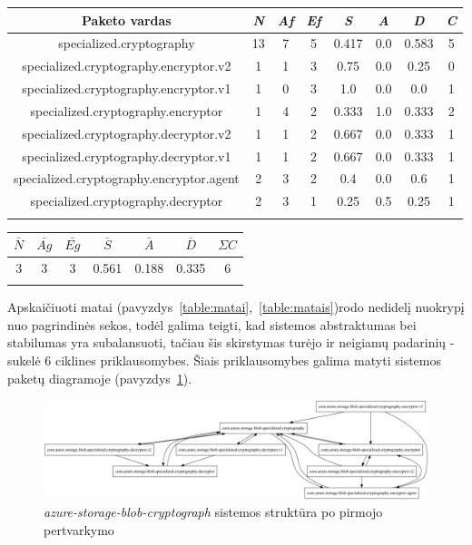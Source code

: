 \begin{center}
    \begin{tabular}{|c|c|c|c|c|c|c|c|}
        \hline
        Paketo vardas & \textit{N} & \textit{Af} & \textit{Ef} & \textit{S} & \textit{A} & \textit{D} & \textit{C} \\ [0.5ex]
        \hline\hline
        specialized.cryptography & 13 & 7 & 5 & 0.417 & 0.0 & 0.583 & 5 \\
        \hline
        specialized.cryptography.encryptor.v2 & 1 & 1 & 3 & 0.75 & 0.0 & 0.25 & 0 \\
        \hline
        specialized.cryptography.encryptor.v1 & 1 & 0 & 3 & 1.0 & 0.0 & 0.0 & 1 \\
        \hline
        specialized.cryptography.encryptor & 1 & 4 & 2 & 0.333 & 1.0 & 0.333 & 2 \\
        \hline
        specialized.cryptography.decryptor.v2 & 1 & 1 & 2 & 0.667 & 0.0 & 0.333 & 1 \\
        \hline
        specialized.cryptography.decryptor.v1 & 1 & 1 & 2 & 0.667 & 0.0 & 0.333 & 1\\
        \hline
        specialized.cryptography.encryptor.agent & 2 & 3 & 2 & 0.4 & 0.0 & 0.6 & 1\\
        \hline
        specialized.cryptography.decryptor & 2 & 3 & 1 & 0.25 & 0.5 & 0.25 & 1 \\
        \hline
    \label{table:matai}
    \end{tabular}
    \begin{tabular}{|c|c|c|c|c|c|c|}
        \hline
        $\bar{N}$ & $\bar{Ag}$ & $\bar{Eg}$ & $\bar{S}$ & $\bar{A}$ & $\bar{D}$ & $\Sigma C$ \\ [0.5ex]
        \hline\hline
        3 & 3 & 3 & 0.561 & 0.188 & \cellcolor{green!25} 0.335 & \cellcolor{red!25} 6 \\
        \hline
    \label{table:matais}
    \end{tabular}
\end{center}
Apskaičiuoti matai (pavyzdys~\ref{table:matai},~\ref{table:matais})rodo nedidelį nuokrypį nuo pagrindinės sekos, todėl galima teigti, kad sistemos abstraktumas bei stabilumas
yra subalansuoti, tačiau šis skirstymas turėjo ir neigiamų padarinių - sukelė 6 ciklines priklausomybes.
Šiais priklausomybes galima matyti sistemos paketų diagramoje (pavyzdys~\ref{fig:azure_packages_v1}).
\begin{figure}[H]
    \centering
    \includegraphics[scale=0.3]{img/azure_packages_v1}
    \caption{\textit{azure-storage-blob-cryptograph} sistemos struktūra po pirmojo pertvarkymo}
    \label{fig:azure_packages_v1}
\end{figure}
